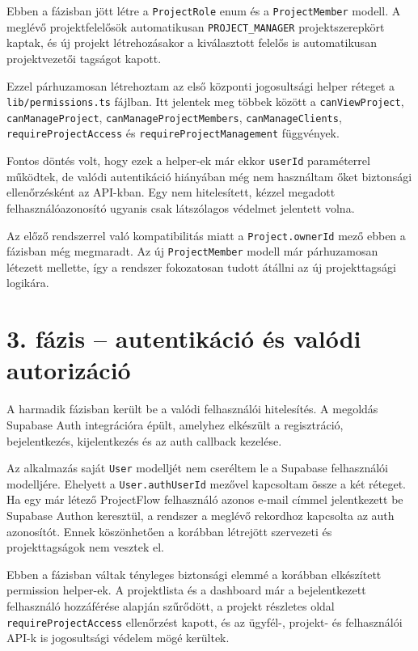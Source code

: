 \documentclass[11pt,a4paper]{report}
\begin{document}
    Ebben a fázisban jött létre a \texttt{ProjectRole} enum és a
    \texttt{ProjectMember} modell. A meglévő projektfelelősök automatikusan
    \texttt{PROJECT\_MANAGER} projektszerepkört kaptak, és új projekt
    létrehozásakor a kiválasztott felelős is automatikusan projektvezetői
    tagságot kapott.

    Ezzel párhuzamosan létrehoztam az első központi jogosultsági helper réteget a
    \texttt{lib/permissions.ts} fájlban. Itt jelentek meg többek között a
    \texttt{canViewProject}, \texttt{canManageProject},
    \texttt{canManageProjectMembers}, \texttt{canManageClients},
    \texttt{requireProjectAccess} és \texttt{requireProjectManagement}
    függvények.

    Fontos döntés volt, hogy ezek a helper-ek már ekkor \texttt{userId}
    paraméterrel működtek, de valódi autentikáció hiányában még nem használtam őket
    biztonsági ellenőrzésként az API-kban. Egy nem hitelesített, kézzel megadott
    felhasználóazonosító ugyanis csak látszólagos védelmet jelentett volna.

    Az előző rendszerrel való kompatibilitás miatt a \texttt{Project.ownerId}
    mező ebben a fázisban még megmaradt. Az új \texttt{ProjectMember} modell már
    párhuzamosan létezett mellette, így a rendszer fokozatosan tudott átállni az
    új projekttagsági logikára.

    \section{3. fázis -- autentikáció és valódi autorizáció}

    A harmadik fázisban került be a valódi felhasználói hitelesítés. A megoldás
    Supabase Auth integrációra épült, amelyhez elkészült a regisztráció,
    bejelentkezés, kijelentkezés és az auth callback kezelése.

    Az alkalmazás saját \texttt{User} modelljét nem cseréltem le a Supabase
    felhasználói modelljére. Ehelyett a \texttt{User.authUserId} mezővel
    kapcsoltam össze a két réteget. Ha egy már létező ProjectFlow felhasználó azonos
    e-mail címmel jelentkezett be Supabase Authon keresztül, a rendszer a meglévő
    rekordhoz kapcsolta az auth azonosítót. Ennek köszönhetően a korábban létrejött
    szervezeti és projekttagságok nem vesztek el.

    Ebben a fázisban váltak tényleges biztonsági elemmé a korábban elkészített
    permission helper-ek. A projektlista és a dashboard már a bejelentkezett
    felhasználó hozzáférése alapján szűrődött, a projekt részletes oldal
    \texttt{requireProjectAccess} ellenőrzést kapott, és az ügyfél-, projekt- és
    felhasználói API-k is jogosultsági védelem mögé kerültek.
\end{document}
